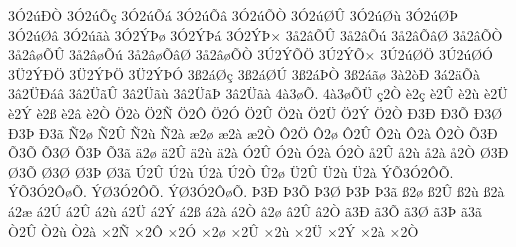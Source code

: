 {3^^d32^^fa^^d0^^d2
3^^d32^^fa^^d5^^e7
3^^d32^^fa^^d5^^e1
3^^d32^^fa^^d5^^e2
3^^d32^^fa^^d5^^d2
3^^d32^^fa^^d8^^db
3^^d32^^fa^^d8^^f9
3^^d32^^fa^^d8^^de
3^^d32^^fa^^d8^^e2
3^^d32^^fa^^e3^^e0
3^^d32^^dd^^de^^f8
3^^d32^^dd^^de^^e1
3^^d32^^dd^^de^^d7
3^^e52^^e2^^d5^^db
3^^e52^^e2^^d5^^fa
3^^e52^^e2^^d5^^e2^^d8
3^^e52^^e2^^d5^^d2
3^^e52^^e2^^f8^^d5^^db
3^^e52^^e2^^f8^^d5^^fa
3^^e52^^e2^^f8^^d5^^e2^^d8
3^^e52^^e2^^f8^^d5^^d2
3^^da2^^dd^^d5^^d6
3^^da2^^dd^^d5^^d7
3^^da2^^fa^^d8^^d6
3^^da2^^fa^^d8^^d3
3^^dc2^^dd^^d0^^d6
3^^dc2^^dd^^de^^d6
3^^dc2^^dd^^de^^d3
3^^df2^^e1^^d8^^e7
3^^df2^^e1^^d8^^da
3^^df2^^e1^^de^^d2
3^^df2^^e1^^e3^^f8
3^^e02^^f2^^d0
3^^e12^^e4^^d5^^e0
3^^e22^^dc^^d0^^e1^^e2
3^^e22^^dc^^e3^^db
3^^e22^^dc^^e3^^f9
3^^e22^^dc^^e3^^de
3^^e22^^dc^^e3^^e0
4^^e03^^f8^^d5.
4^^e03^^f8^^d5^^dc
^^e72^^d2
^^e82^^e7
^^e82^^db
^^e82^^f9
^^e82^^dc
^^e82^^dd
^^e82^^df
^^e82^^e2
^^e82^^d2
^^d62^^f2
^^d62^^d1
^^d62^^d4
^^d62^^d3
^^d62^^db
^^d62^^f9
^^d62^^dc
^^d62^^dd
^^d62^^d2
^^d03^^d0
^^d03^^d5
^^d03^^d8
^^d03^^de
^^d03^^e3
^^d12^^f8
^^d12^^db
^^d12^^f9
^^d12^^e0
^^e62^^f8
^^e62^^e0
^^e62^^d2
^^d42^^d6
^^d42^^f8
^^d42^^db
^^d42^^f9
^^d42^^e0
^^d42^^d2
^^d53^^d0
^^d53^^d5
^^d53^^d8
^^d53^^de
^^d53^^e3
^^e42^^f8
^^e42^^db
^^e42^^f9
^^e42^^e0
^^d32^^db
^^d32^^f9
^^d32^^e0
^^d32^^d2
^^e52^^db
^^e52^^f9
^^e52^^e0
^^e52^^d2
^^d83^^d0
^^d83^^d5
^^d83^^d8
^^d83^^de
^^d83^^e3
^^da2^^db
^^da2^^f9
^^da2^^e0
^^da2^^d2
^^db2^^f8
^^dc2^^db
^^dc2^^f9
^^dc2^^e0
^^dd^^d53^^d32^^d4^^d5.
^^dd^^d53^^d32^^d4^^f8^^d5.
^^dd^^d83^^d32^^d4^^d5.
^^dd^^d83^^d32^^d4^^f8^^d5.
^^de3^^d0
^^de3^^d5
^^de3^^d8
^^de3^^de
^^de3^^e3
^^df2^^f8
^^df2^^db
^^df2^^f9
^^df2^^e0
^^e12^^e6
^^e12^^da
^^e12^^db
^^e12^^f9
^^e12^^dc
^^e12^^dd
^^e12^^df
^^e12^^e0
^^e12^^d2
^^e22^^f8
^^e22^^db
^^e22^^d2
^^e33^^d0
^^e33^^d5
^^e33^^d8
^^e33^^de
^^e33^^e3
^^d22^^db
^^d22^^f9
^^d22^^e0
^^d72^^d1
^^d72^^d4
^^d72^^d3
^^d72^^f8
^^d72^^db
^^d72^^f9
^^d72^^dc
^^d72^^dd
^^d72^^e0
^^d72^^d2
}
